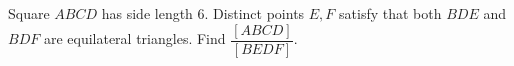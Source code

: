Square $ABCD$ has side length $6$. Distinct points $E,F$ satisfy that both $BDE$ and $BDF$ are equilateral triangles. Find $\dfrac{[ABCD]}{[BEDF]}$.

